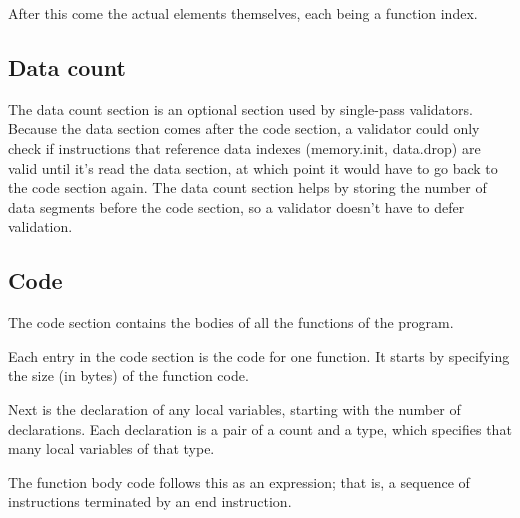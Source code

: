 \documentclass[10pt,a4paper]{article}
\newcommand{\instr}[1]{\textsf{#1}}
\begin{document}
After this come the actual elements themselves, each being a function index.




\subsection*{Data count}

The data count section is an optional section used by single-pass validators. Because the data section comes after the code section, a validator could only check if instructions that reference data indexes (\instr{memory.init}, \instr{data.drop}) are valid until it's read the data section, at which point it would have to go back to the code section again. The data count section helps by storing the number of data segments before the code section, so a validator doesn't have to defer validation.




\subsection*{Code}

The code section contains the bodies of all the functions of the program.



Each entry in the code section is the code for one function.
It starts by specifying the size (in bytes) of the function code.

Next is the declaration of any local variables, starting with the number of declarations. Each declaration is a pair of a count and a type, which specifies that many local variables of that type.

The function body code follows this as an expression; that is, a sequence of instructions terminated by an \instr{end} instruction.




\end{document}
